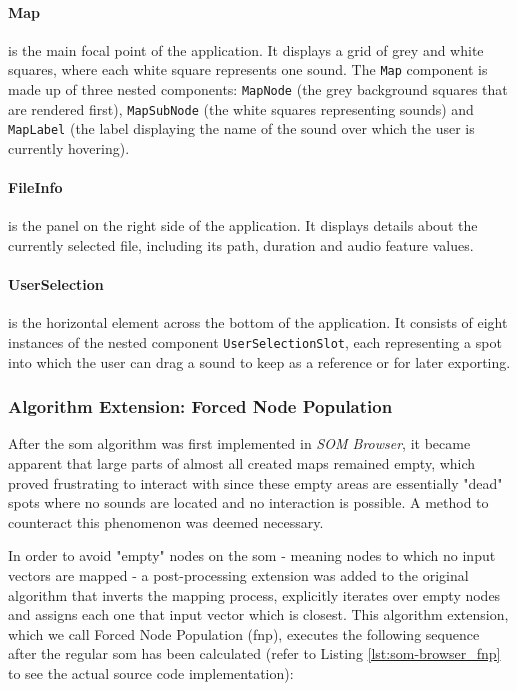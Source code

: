 \paragraph*{Map}
\label{para:map}
is the main focal point of the application. It displays a grid of grey and white
squares, where each white square represents one sound. The \texttt{Map}
component is made up of three nested components: \texttt{MapNode} (the
grey background squares that are rendered first), \texttt{MapSubNode}
(the white squares representing sounds) and \texttt{MapLabel} (the
label displaying the name of the sound over which the user is currently
hovering).

\paragraph*{FileInfo}
\label{para:file_info}
is the panel on the right side of the application. It displays details about the
currently selected file, including its path, duration and audio feature values.

\paragraph*{UserSelection}
\label{para:user_selection}
is the horizontal element across the bottom of the application. It consists of
eight instances of the nested component \texttt{UserSelectionSlot},
each representing a spot into which the user can drag a sound to keep as a
reference or for later exporting.

\subsubsection{Algorithm Extension: Forced Node Population}
\label{subsubsec:som_forced_population}

After the \gls{som} algorithm was first implemented in \textit{SOM Browser}, it
became apparent that large parts of almost all created maps remained empty,
which proved frustrating to interact with since these empty areas are
essentially "dead" spots where no sounds are located and no interaction is
possible. A method to counteract this phenomenon was deemed necessary.

\smallskip

In order to avoid "empty" nodes on the \gls{som} - meaning nodes to which no
input vectors are mapped - a post-processing extension was added to the original
algorithm that inverts the mapping process, explicitly iterates over empty nodes
and assigns each one that input vector which is closest. This algorithm
extension, which we call Forced Node Population (\gls{fnp}), executes the
following sequence after the regular \gls{som} has been calculated (refer to
Listing \ref{lst:som-browser_fnp} to see the actual source code implementation):

